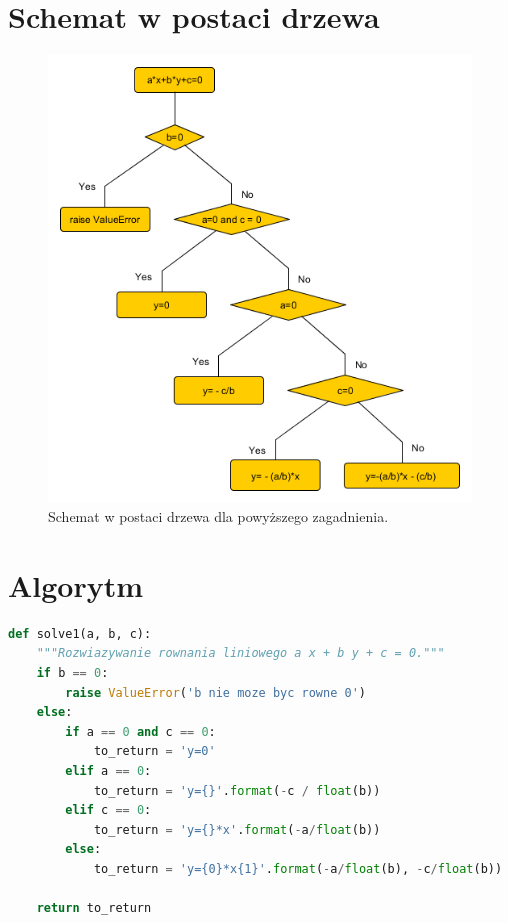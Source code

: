 \documentclass[a4paper]{article}
\begin{document}
\section{Schemat w postaci drzewa}
\begin{figure}[H]
	\begin{center}
		\includegraphics[width=15cm]{tree_diagram.png}
		\caption{Schemat w postaci drzewa dla powyższego zagadnienia.}
	\end{center}	
\end{figure}
\newpage

\section{Algorytm}
\begin{lstlisting}[language=Python]
def solve1(a, b, c):
    """Rozwiazywanie rownania liniowego a x + b y + c = 0."""
    if b == 0:
        raise ValueError('b nie moze byc rowne 0')
    else:
        if a == 0 and c == 0:
            to_return = 'y=0'
        elif a == 0:
            to_return = 'y={}'.format(-c / float(b))
        elif c == 0:
            to_return = 'y={}*x'.format(-a/float(b))
        else:
            to_return = 'y={0}*x{1}'.format(-a/float(b), -c/float(b))

    return to_return
\end{lstlisting}
\end{document}
